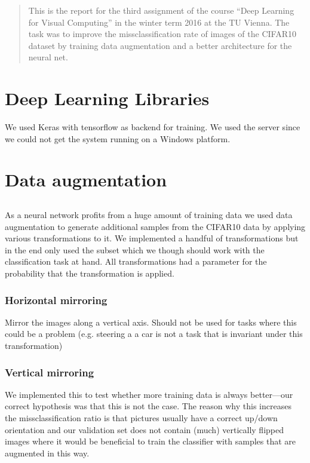 \newcommand{\ttitle}{Image Classification with CNN}
\hyphenation{}
\maketitle
\begin{abstract}
This is the report for the third assignment of the course ``Deep Learning for Visual Computing'' in the winter term 2016 at the TU Vienna. The task was to improve the missclassification rate of images of  the CIFAR10~\cite{CIFAR10} dataset by training data augmentation and a better architecture for the neural net.
\end{abstract}

\section{Deep Learning Libraries}
We used Keras with tensorflow as backend for training. We used the server since we could not get the system running on a Windows platform. 

\section{Data augmentation}
\subsection{}
As a neural network profits from a huge amount of training data we used data augmentation to generate additional samples from the CIFAR10 data by applying various transformations to it. We implemented a handful of transformations but in the end only used the subset which we though should work with the classification task at hand. All transformations had a parameter  for the probability that the transformation is applied. 
\subsubsection{Horizontal mirroring} Mirror the images along a vertical axis. Should not be used for tasks where this could be a problem (e.g. steering a a car is not a task that is invariant under this transformation)
\subsubsection{Vertical mirroring} We implemented this to test whether more training data is always better---our correct hypothesis was that this is not the case. The reason why this increases the missclassification ratio is that pictures usually have a correct up/down orientation and our validation set does not contain (much) vertically flipped images where it would be beneficial to train the classifier with samples that are augmented in this way. 
